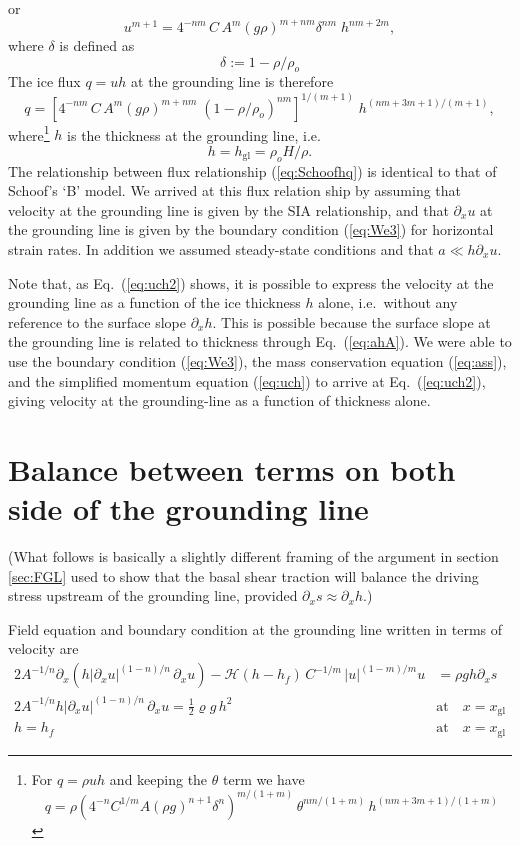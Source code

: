 \documentclass[10pt,a4paper]{book}
\newcommand{\He}{\mathcal{H}}
\newcommand{\p}{\partial}
\newcommand{\xgl}{x_{\mathrm{gl}}}
\begin{document}
or
\[
u^{m+1}=  4^{-n m}\, C \,  A^m (g \rho)^{m+n m} \delta^{n m}  \;  h^{n m + 2 m} ,
\]
where $\delta$ is defined as
\[
\delta := 1- \rho/\rho_o
\]
The ice flux  $q=uh$ at the grounding line is therefore
\begin{equation}
q=  \left [ 4^{-n m} \, C \, A^m  (g \rho)^{m+n m} \; \left (1-\rho/\rho_o \right )^{n m}  \right ]^{1/(m+1)}  \; h^{(n m + 3 m + 1)/(m+1)} ,
\label{eq:Schoofhq}
\end{equation}
where\footnote{For $q=\rho u h$ and keeping the $\theta$ term we have
\[
q=\rho  \left ( 4^{-n} C^{1/m} A (\rho g)^{n+1} \delta^n  \right )^{m/(1+m)} \, \theta^{nm/(1+m)} \,  h^{(n m +3 m+1)/(1+m)} 
\]
} $h$ is the thickness at the grounding line, i.e.
\[
h=h_{\mathrm{gl}}=\rho_o H /\rho.
\]
The relationship between flux relationship (\ref{eq:Schoofhq}) is
identical to that of Schoof's `B' model.  We arrived at this flux
relation ship by assuming that velocity at the grounding line is given
by the SIA relationship, and that $\p_x u$ at the grounding line is
given by the boundary condition (\ref{eq:We3}) for horizontal strain
rates. In addition we assumed steady-state conditions and that $a
\ll h \p_x u$.


Note that, as Eq.~(\ref{eq:uch2}) shows, it is possible to express the
velocity at the grounding line as a function of the ice thickness $h$
alone, i.e.\ without any reference to the surface slope $\p_x h$. This
is possible because the surface slope at the grounding line is related
to thickness through Eq.~(\ref{eq:ahA}). We were able to use the
boundary condition (\ref{eq:We3}), the mass conservation equation
(\ref{eq:ass}), and the simplified momentum equation (\ref{eq:uch}) to
arrive at Eq.~(\ref{eq:uch2}), giving velocity at the grounding-line
as a function of thickness alone. 


\section{Balance between terms on both side of the grounding line}

(What follows is basically a slightly different framing of the argument in
section \ref{sec:FGL} used to show that the basal shear traction will
balance the driving stress upstream of the grounding line, provided
$\p_x s \approx \p_x h$.)

Field equation and boundary condition at the
grounding line written in terms of velocity are
\begin{align}
2 A^{-1/n} \p_x \left (h |\p_x u|^{(1-n)/n} \, \p_x u \right ) - \He(h-h_f) \, C^{-1/m} \, |u|^{(1-m)/m} u & = \rho g h \p_x s  \label{eq:velssa}\\
2 A^{-1/n} h |\p_x u|^{(1-n)/n}   \, \p_x u  = \frac{1}{2} \varrho g \, h^2   \quad & \text{at} \quad x=\xgl\label{eq:bc1b} \\
h=h_f     \quad & \text{at} \quad x=\xgl\label{eq:bc2b}
\end{align}
\end{document}
